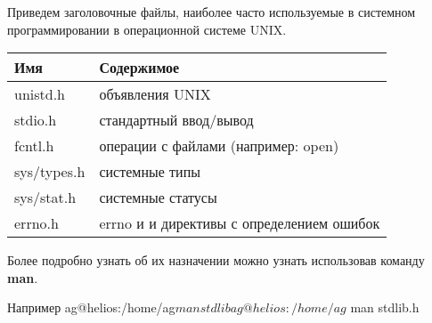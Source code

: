 Приведем заголовочные файлы, наиболее часто используемые в системном программировании в операционной системе UNIX.

	\begin{center}
		\begin{tabular}{l|l}	
			\textbf{Имя} & \textbf{Содержимое} \\
			\hline
			unistd.h 	& объявления UNIX \\
			\hline
			stdio.h  	& стандартный ввод/вывод \\
			\hline
			fcntl.h  	& операции с файлами (например: open) \\
			\hline
			sys/types.h	& системные типы \\
			\hline
			sys/stat.h	& системные статусы \\
			\hline
			errno.h	& errno и и директивы с определением ошибок \\
		\end{tabular}
		\end{center}
		
Более подробно узнать об их назначении можно узнать использовав команду \textbf{man}.

	\begin{shCode}{Например}
		ag@helios:/home/ag$ man stdlib 
		ag@helios:/home/ag$ man stdlib.h \end{shCode}
